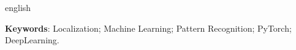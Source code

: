
\begin{resumo}[Abstract]
 \begin{otherlanguage*}{english}


   \vspace{\onelineskip}
 
   \noindent 
   \textbf{Keywords}: Localization; Machine Learning; Pattern Recognition; PyTorch; DeepLearning.
 \end{otherlanguage*}
\end{resumo}